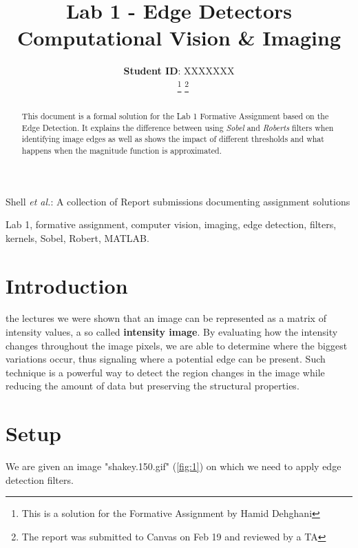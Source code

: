 \documentclass[lettersize,journal]{IEEEtran}
\begin{document}
\title{Lab 1 - Edge Detectors \\ \vspace{0.1em} \LARGE Computational Vision \& Imaging}

\author{\textbf{Student ID}: XXXXXXX \\
~
\thanks{This is a solution for the Formative Assignment by Hamid Dehghani}
\thanks{The report was submitted to Canvas on Feb 19 and reviewed by a TA}}

%
{Shell \MakeLowercase{\textit{et al.}}: A collection of Report submissions documenting assignment solutions}

\maketitle

\begin{abstract}
This document is a formal solution for the Lab 1 Formative Assignment based on the Edge Detection. It explains the difference between using \emph{Sobel} and \emph{Roberts} filters when identifying image edges as well as shows the impact of different thresholds and what happens when the magnitude function is approximated.
\end{abstract}

\begin{IEEEkeywords}
Lab 1, formative assignment, computer vision, imaging, edge detection, filters, kernels, Sobel, Robert, MATLAB.
\end{IEEEkeywords}

\section{Introduction}
 the lectures we were shown that an image can be represented as a matrix of intensity values, a so called \textbf{intensity image}. By evaluating how the intensity changes throughout the image pixels, we are able to determine where the biggest variations occur, thus signaling where a potential edge can be present. Such technique is a powerful way to detect the region changes in the image while reducing the amount of data but preserving the structural properties.

\section{Setup}
We are given an image "shakey.150.gif" (\ref{fig:1}) on which we need to apply edge detection filters.
\end{document}
